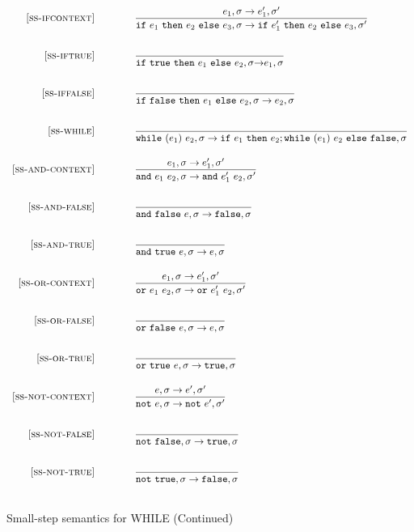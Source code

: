 \documentclass{article}
\begin{document}
\begin{figure}[H]
\caption{Small-step semantics for WHILE (Continued)}
\[
\begin{array}{r@{\qquad\qquad}l}

\ssrule{ss-ifcontext}{
  {e_1},{\sigma}\rightarrow{e_1'},{\sigma'}
}{
  {\ife{e_1}{e_2}{e_3}},{\sigma}\rightarrow{\ife{e_1'}{e_2}{e_3}},{\sigma'}
}
\ssrule{ss-iftrue}{  
}{
  {\ife{\true}{e_1}{e_2}},{\sigma}{\rightarrow}{e_1},{\sigma}
}
\ssrule{ss-iffalse}{
}{
  {\ife{\false}{e_1}{e_2}},{\sigma}\rightarrow{e_2},{\sigma}
}
\ssrule{ss-while}{
}{
  {\whilee{e_1}{e_2}},{\sigma}\rightarrow{\ife{e_1}{e_2;\whilee{e_1}{e_2}}{\false}},{\sigma}
}
\ssrule{ss-and-context}{
  {e_1},{\sigma}\rightarrow{e_1'},{\sigma'}
}{
   {\andee {e_1} {e_2}},{\sigma}\rightarrow{\andee {e_1'} {e_2}},{\sigma'}
}
\ssrule{ss-and-false}{
}{
   {\andee {\false} {e}},{\sigma}\rightarrow{\false},{\sigma}
}
\ssrule{ss-and-true}{
}{
   {\andee {\true} {e}},{\sigma}\rightarrow{e},{\sigma}
}
\ssrule{ss-or-context}{
  {e_1},{\sigma}\rightarrow{e_1'},{\sigma'}
}{
   {\oree {e_1} {e_2}},{\sigma}\rightarrow{\oree {e_1'} {e_2}},{\sigma'}
}
\ssrule{ss-or-false}{
}{
   {\oree {\false} {e}},{\sigma}\rightarrow{e},{\sigma}
}
\ssrule{ss-or-true}{
}{
   {\oree {\true} {e}},{\sigma}\rightarrow{\true},{\sigma}
}
\ssrule{ss-not-context}{
  {e},{\sigma}\rightarrow{e'},{\sigma'}
}{
   {\note {e}},{\sigma}\rightarrow{\note {e'}},{\sigma'}
}
\ssrule{ss-not-false}{
}{
   {\note {\false}},{\sigma}\rightarrow{\true},{\sigma}
}
\ssrule{ss-not-true}{
}{
   {\note {\true}},{\sigma}\rightarrow{\false},{\sigma}
}

\end{array}
\]
\end{figure}
\end{document}
